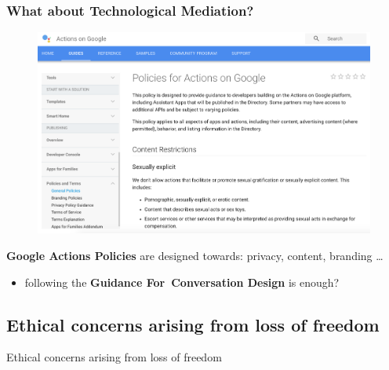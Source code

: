 \documentclass{beamer}
\begin{document}
\begin{frame}
\frametitle{What about Technological Mediation?}
\vspace{-0.5cm}
\begin{figure}
	\centering
	\includegraphics[width=0.95\linewidth]{images/dev_policy}
	\label{fig:devpolicy}
\end{figure}

\textbf{Google Actions Policies} are designed towards: privacy, content, branding \dots
\begin{itemize}
	\item following the \textbf{Guidance For Conversation Design} is enough?
\end{itemize}
\end{frame}

\subsection{Ethical concerns arising from loss of freedom}
\begin{frame}
\begin{center} 
	 Ethical concerns arising from loss of freedom
\end{center}
\end{frame}
\end{document}
